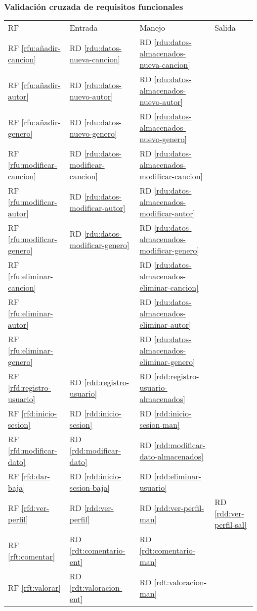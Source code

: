 \subsubsection{Validación cruzada de requisitos funcionales}
\begin{tabularx}{\linewidth}{l|XXX}
  RF & Entrada & Manejo & Salida \\
  RF \ref{rfu:añadir-cancion} & RD \ref{rdu:datos-nueva-cancion} & RD \ref{rdu:datos-almacenados-nueva-cancion} & \\
  RF \ref{rfu:añadir-autor} & RD \ref{rdu:datos-nuevo-autor} & RD \ref{rdu:datos-almacenados-nuevo-autor} & \\
  RF \ref{rfu:añadir-genero} & RD \ref{rdu:datos-nuevo-genero} & RD \ref{rdu:datos-almacenados-nuevo-genero}  & \\
  RF \ref{rfu:modificar-cancion} & RD \ref{rdu:datos-modificar-cancion} & RD \ref{rdu:datos-almacenados-modificar-cancion}  & \\
  RF \ref{rfu:modificar-autor} & RD \ref{rdu:datos-modificar-autor} & RD \ref{rdu:datos-almacenados-modificar-autor} & \\
  RF \ref{rfu:modificar-genero} & RD \ref{rdu:datos-modificar-genero} & RD \ref{rdu:datos-almacenados-modificar-genero}  & \\
  RF \ref{rfu:eliminar-cancion} & & RD \ref{rdu:datos-almacenados-eliminar-cancion}  & \\
  RF \ref{rfu:eliminar-autor} & & RD \ref{rdu:datos-almacenados-eliminar-autor} & \\
  RF \ref{rfu:eliminar-genero} &  & RD \ref{rdu:datos-almacenados-eliminar-genero}  & \\
  RF \ref{rfd:registro-usuario} & RD \ref{rdd:registro-usuario} & RD \ref{rdd:registro-usuario-almacenados} & \\
  RF \ref{rfd:inicio-sesion} & RD \ref{rdd:inicio-sesion} & RD \ref{rdd:inicio-sesion-man} & \\
  RF \ref{rfd:modificar-dato} &  RD \ref{rdd:modificar-dato} & RD \ref{rdd:modificar-dato-almacenados} & \\
  RF \ref{rfd:dar-baja} & RD \ref{rdd:inicio-sesion-baja} & RD \ref{rdd:eliminar-usuario} & \\
  RF \ref{rfd:ver-perfil} & RD \ref{rdd:ver-perfil} & RD \ref{rdd:ver-perfil-man} & RD \ref{rdd:ver-perfil-sal} \\
  RF \ref{rft:comentar} & RD \ref{rdt:comentario-ent} & RD \ref{rdt:comentario-man} & \\
  RF \ref{rft:valorar} & RD \ref{rdt:valoracion-ent} & RD \ref{rdt:valoracion-man} & \\

\end{tabularx}
